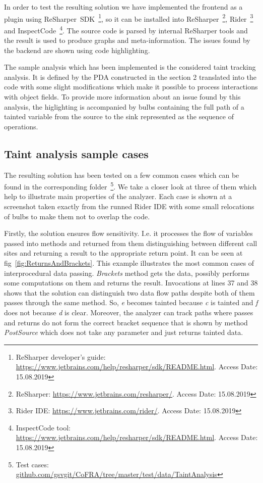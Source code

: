 In order to test the resulting solution we have implemented the frontend as a plugin using ReSharper~SDK~\footnote{ReSharper developer's guide: \url{https://www.jetbrains.com/help/resharper/sdk/README.html}. Access Date: 15.08.2019}, so it can be installed into ReSharper~\footnote{ReSharper: \url{https://www.jetbrains.com/resharper/}. Access Date: 15.08.2019}, Rider~\footnote{Rider IDE: \url{https://www.jetbrains.com/rider/}. Access Date: 15.08.2019} and InspectCode~\footnote{InspectCode tool: \url{https://www.jetbrains.com/help/resharper/sdk/README.html}. Access Date: 15.08.2019}.
The source code is parsed by internal ReSharper tools and the result is used to produce graphs and meta-information.
The issues found by the backend are shown using code highlighting.

The sample analysis which has been implemented is the considered taint tracking analysis.
It is defined by the PDA constructed in the section 2 translated into the code with some slight modifications which make it possible to process interactions with object fields.
To provide more information about an issue found by this analysis, the higlighting is accompanied by bulbs containing the full path of a tainted variable from the source to the sink represented as the sequence of operations.

\subsection{Taint analysis sample cases}

The resulting solution has been tested on a few common cases which can be found in the corresponding folder~\footnote{Test cases: \url{github.com/gsvgit/CoFRA/tree/master/test/data/TaintAnalysis}}.
We take a closer look at three of them which help to illustrate main properties of the analyzer.
Each case is shown at a screenshot taken exactly from the runned Rider IDE with some small relocations of bulbs to make them not to overlap the code.

Firstly, the solution ensures flow sensitivity. I.e. it processes the flow of variables passed into methods and returned from them distinguishing between different call sites and returning a result to the appropriate return point.
It can be seen at fig~\ref{fig:ReturnsAndBrackets}.
This example illustrates the most common cases of interprocedural data passing.
\textit{Brackets} method gets the data, possibly performs some computations on them and returns the result.
Invocations at lines 37 and 38 shows that the solution can distinguish two data flow paths despite both of them passes through the same method.
So, \textit{e} becomes tainted because \textit{c} is tainted and \textit{f} does not because \textit{d} is clear.
Moreover, the analyzer can track paths where passes and returns do not form the correct bracket sequence that is shown by method \textit{PostSource} which does not take any parameter and just returns tainted data.

